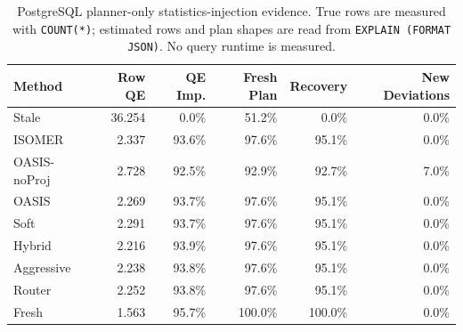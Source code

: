 \begin{table}[t]
  \centering
  \small
  \caption{PostgreSQL planner-only statistics-injection evidence. True rows are measured with \texttt{COUNT(*)}; estimated rows and plan shapes are read from \texttt{EXPLAIN (FORMAT JSON)}. No query runtime is measured.}
  \label{tab:postgres_planner_stats_injection}
  \setlength{\tabcolsep}{4pt}
  \begin{tabular}{lrrrrr}
    \toprule
    Method & Row QE & QE Imp. & Fresh Plan & Recovery & New Deviations \\
    \midrule
    Stale & 36.254 & 0.0\% & 51.2\% & 0.0\% & 0.0\% \\
    ISOMER & 2.337 & 93.6\% & 97.6\% & 95.1\% & 0.0\% \\
    OASIS-noProj & 2.728 & 92.5\% & 92.9\% & 92.7\% & 7.0\% \\
    OASIS & 2.269 & 93.7\% & 97.6\% & 95.1\% & 0.0\% \\
    Soft & 2.291 & 93.7\% & 97.6\% & 95.1\% & 0.0\% \\
    Hybrid & 2.216 & 93.9\% & 97.6\% & 95.1\% & 0.0\% \\
    Aggressive & 2.238 & 93.8\% & 97.6\% & 95.1\% & 0.0\% \\
    Router & 2.252 & 93.8\% & 97.6\% & 95.1\% & 0.0\% \\
    Fresh & 1.563 & 95.7\% & 100.0\% & 100.0\% & 0.0\% \\
    \bottomrule
  \end{tabular}
\end{table}
